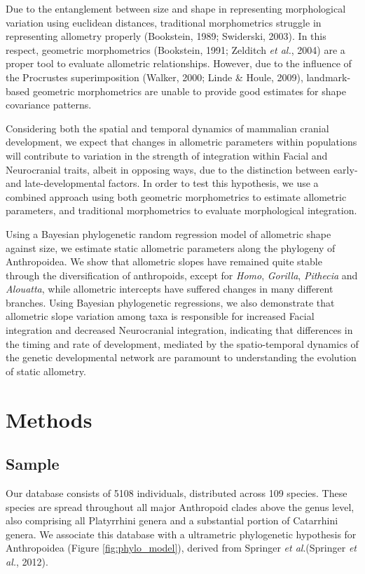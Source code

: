 \documentclass[12pt,]{article}
\begin{document}
Due to the entanglement between size and shape in representing
morphological variation using euclidean distances, traditional
morphometrics struggle in representing allometry properly (Bookstein,
1989; Swiderski, 2003). In this respect, geometric morphometrics
(Bookstein, 1991; Zelditch \emph{et al.}, 2004) are a proper tool to
evaluate allometric relationships. However, due to the influence of the
Procrustes superimposition (Walker, 2000; Linde \& Houle, 2009),
landmark-based geometric morphometrics are unable to provide good
estimates for shape covariance patterns.

Considering both the spatial and temporal dynamics of mammalian cranial
development, we expect that changes in allometric parameters within
populations will contribute to variation in the strength of integration
within Facial and Neurocranial traits, albeit in opposing ways, due to
the distinction between early- and late-developmental factors. In order
to test this hypothesis, we use a combined approach using both geometric
morphometrics to estimate allometric parameters, and traditional
morphometrics to evaluate morphological integration.

Using a Bayesian phylogenetic random regression model of allometric
shape against size, we estimate static allometric parameters along the
phylogeny of Anthropoidea. We show that allometric slopes have remained
quite stable through the diversification of anthropoids, except for
\emph{Homo}, \emph{Gorilla}, \emph{Pithecia} and \emph{Alouatta}, while
allometric intercepts have suffered changes in many different branches.
Using Bayesian phylogenetic regressions, we also demonstrate that
allometric slope variation among taxa is responsible for increased
Facial integration and decreased Neurocranial integration, indicating
that differences in the timing and rate of development, mediated by the
spatio-temporal dynamics of the genetic developmental network are
paramount to understanding the evolution of static allometry.

\section{Methods}\label{methods}

\subsection{Sample}\label{sample}

Our database consists of 5108 individuals, distributed across 109
species. These species are spread throughout all major Anthropoid clades
above the genus level, also comprising all Platyrrhini genera and a
substantial portion of Catarrhini genera. We associate this database
with a ultrametric phylogenetic hypothesis for Anthropoidea (Figure
\ref{fig:phylo_model}), derived from Springer \emph{et al}.(Springer
\emph{et al.}, 2012).
\end{document}
